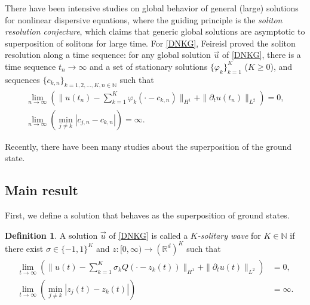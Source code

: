 \documentclass[reqno]{amsart}
\theoremstyle{plain}
\theoremstyle{definition}
\newtheorem{definition}{Definition}[section]
\numberwithin{equation}{section}
\newcommand{\1}{\mathbbm{1}}
\begin{document}
There have been intensive studies on global behavior of general (large) solutions for nonlinear dispersive equations, where the guiding principle is the \textit{soliton resolution conjecture}, which claims that generic global solutions are asymptotic to superposition of solitons for large time. For \eqref{DNKG}, Feireisl \cite{F} proved the soliton resolution along a time sequence: for any global solution $\vec{u}$ of \eqref{DNKG}, there is a time sequence $t_n\to \infty$ and a set of stationary solutions $\{ \varphi_k\}_{k=1}^K$ ($K\geq 0$), and sequences $\{ c_{k,n}\}_{k=1,2,\ldots, K,n\in \mathbb{N}}$ such that
\begin{align*}
\lim_{n\to\infty} \left( \|u(t_n)-\sum_{k=1}^K\varphi_k(\cdot -c_{k,n})\|_{H^1}+\|{\partial}_tu(t_n)\|_{L^2}\right)=0,
\\
\lim_{n\to\infty} \left(\min_{j\neq k} |c_{j,n}-c_{k,n}|\right)=\infty.
\end{align*}

Recently, there have been many studies about the superposition of the ground state.



















\subsection{Main result}



First, we define a solution that behaves as the superposition of ground states.
\begin{definition}\label{defKsoli}
A solution $\vec{u}$ of \eqref{DNKG} is called a \textit{$K$-solitary wave} for $K\in\mathbb{N}$ if there exist $\sigma \in \{-1,1\}^K$ and $z:[0,\infty)\to (\mathbb{R}^d)^K$ such that 
\begin{align}
\label{Ksoli}
\begin{aligned}
\lim_{t\to \infty} \left(\|u(t)-\sum_{k=1}^K\sigma_k Q(\cdot-z_k(t))\|_{H^1}+\|{\partial}_tu(t)\|_{L^2}\right)&=0,
\\
\lim_{t\to\infty}\left( \min_{j\neq k}|z_j(t)-z_k(t)|\right)&=\infty.
\end{aligned}
\end{align}
\end{definition}
\end{document}
